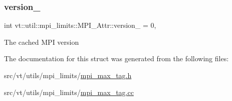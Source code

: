 \subsubsection{\texorpdfstring{version\+\_\+}{version\_}}
{\footnotesize\ttfamily int vt\+::util\+::mpi\+\_\+limits\+::\+M\+P\+I\+\_\+\+Attr\+::version\+\_\+ = 0\hspace{0.3cm}{\ttfamily [static]}, {\ttfamily [private]}}

The cached M\+PI version 

The documentation for this struct was generated from the following files\+:\begin{DoxyCompactItemize}
\item 
src/vt/utils/mpi\+\_\+limits/\hyperlink{mpi__max__tag_8h}{mpi\+\_\+max\+\_\+tag.\+h}\item 
src/vt/utils/mpi\+\_\+limits/\hyperlink{mpi__max__tag_8cc}{mpi\+\_\+max\+\_\+tag.\+cc}\end{DoxyCompactItemize}

